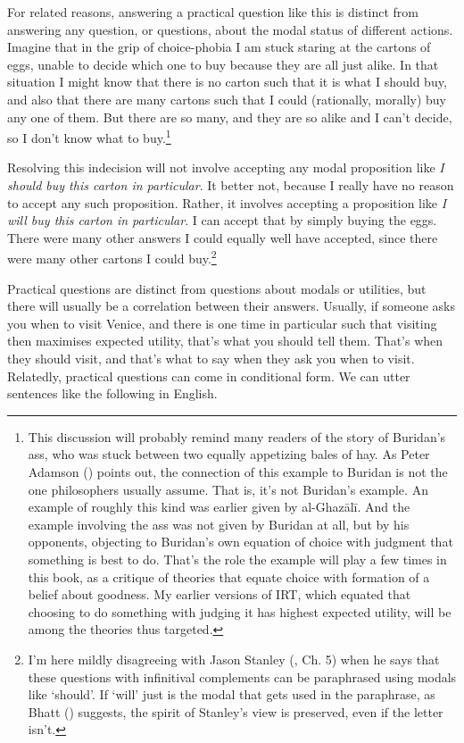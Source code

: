 \documentclass[
  10pt,
  letterpaper,
  twoside]{scrbook}
\begin{document}
For related reasons, answering a practical question like this is
distinct from answering any question, or questions, about the modal
status of different actions. Imagine that in the grip of choice-phobia I
am stuck staring at the cartons of eggs, unable to decide which one to
buy because they are all just alike. In that situation I might know that
there is no carton such that it is what I should buy, and also that
there are many cartons such that I could (rationally, morally) buy any
one of them. But there are so many, and they are so alike and I can't
decide, so I don't know what to buy.\footnote{This discussion will
  probably remind many readers of the story of Buridan's ass, who was
  stuck between two equally appetizing bales of hay. As Peter Adamson
  () points out, the connection
  of this example to Buridan is not the one philosophers usually assume.
  That is, it's not Buridan's example. An example of roughly this kind
  was earlier given by al-Ghazālī. And the example involving the ass was
  not given by Buridan at all, but by his opponents, objecting to
  Buridan's own equation of choice with judgment that something is best
  to do. That's the role the example will play a few times in this book,
  as a critique of theories that equate choice with formation of a
  belief about goodness. My earlier versions of IRT, which equated that
  choosing to do something with judging it has highest expected utility,
  will be among the theories thus targeted.}

Resolving this indecision will not involve accepting any modal
proposition like \emph{I should buy this carton in particular}. It
better not, because I really have no reason to accept any such
proposition. Rather, it involves accepting a proposition like \emph{I
will buy this carton in particular}. I can accept that by simply buying
the eggs. There were many other answers I could equally well have
accepted, since there were many other cartons I could buy.\footnote{I'm
  here mildly disagreeing with Jason Stanley
  (, Ch. 5) when he says that these
  questions with infinitival complements can be paraphrased using modals
  like `should'. If `will' just is the modal that gets used in the
  paraphrase, as Bhatt () suggests, the
  spirit of Stanley's view is preserved, even if the letter isn't.}

Practical questions are distinct from questions about modals or
utilities, but there will usually be a correlation between their
answers. Usually, if someone asks you when to visit Venice, and there is
one time in particular such that visiting then maximises expected
utility, that's what you should tell them. That's when they should
visit, and that's what to say when they ask you when to visit.
Relatedly, practical questions can come in conditional form. We can
utter sentences like the following in English.
\end{document}
